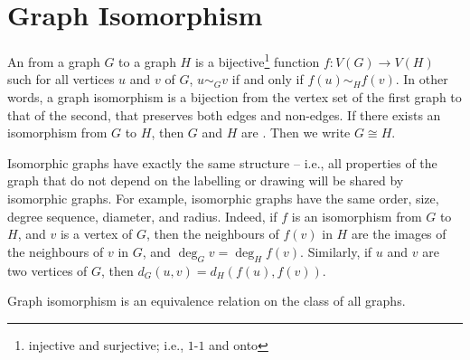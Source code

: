 \section{Graph Isomorphism}\label{sec:Isomorphism}

An  from a graph $G$ to a graph $H$ is a bijective\footnote{injective and surjective; i.e., $1$-$1$ and onto} function $f \colon V(G) \to V(H)$ such for all vertices $u$ and $v$ of $G$, $u \sim_G v$ if and only if $f(u) \sim_H f(v)$. In other words, a graph isomorphism is a bijection from the vertex set of the first graph to that of the second, that preserves both edges and non-edges. If there exists an isomorphism from $G$ to $H$, then $G$ and $H$ are . Then we write $G \cong H$.

Isomorphic graphs have exactly the same structure -- i.e., all properties of the graph that do not depend on the labelling or drawing will be shared by isomorphic graphs. For example, isomorphic graphs have the same order, size, degree sequence, diameter, and radius. Indeed, if $f$ is an isomorphism from $G$ to $H$, and $v$ is a vertex of $G$, then the neighbours of $f(v)$ in $H$ are the images of the neighbours of $v$ in $G$, and $\deg_G v = \deg_H f(v)$. Similarly, if $u$ and $v$ are two vertices of $G$, then $d_G(u, v) = d_H(f(u), f(v))$.

\begin{Theorem}
Graph isomorphism is an equivalence relation on the class of all graphs.
\end{Theorem}

